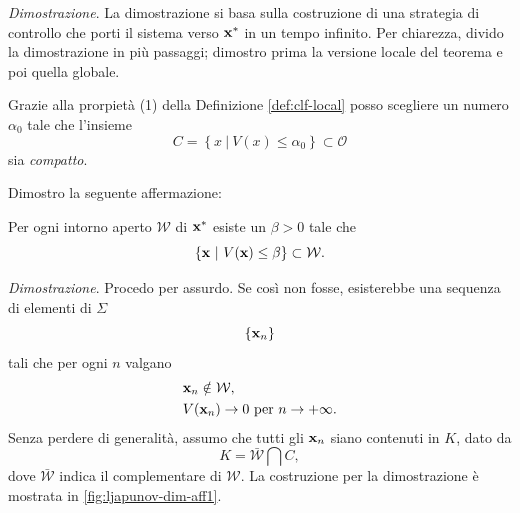 \emph{Dimostrazione}.
La dimostrazione si basa sulla costruzione di una strategia di
controllo che porti il sistema verso $\mathbf{x}^*$ in un tempo infinito.
Per chiarezza, divido la dimostrazione in più passaggi; dimostro prima la versione locale
del teorema e poi quella globale.
\begin{steps}
    \item Grazie alla prorpietà (1) della Definizione \ref{def:clf-local}
    posso scegliere un numero $\alpha_0$ tale che l'insieme
    \begin{equation}
        C = \left\{ x\ |\ V(x) \leq \alpha_0 \right\} \subset \mathcal O
        \label{eq:alpha_0}
    \end{equation}
    sia \emph{compatto}.

    Dimostro la seguente affermazione:

    \begin{aff}
        Per ogni intorno aperto $\mathcal W$ di $\mathbf{x}^*$ esiste
        un $\beta > 0$ tale che
        \begin{equation*}
            \{\mathbf{x}\ |\ V(\mathbf{x}) \leq \beta\} \subset \mathcal W.
        \end{equation*}
    \end{aff}

    \emph{Dimostrazione}.
    Procedo per assurdo.
    Se così non fosse, esisterebbe una sequenza di elementi di $\Sigma$
    \begin{equation*}
    \{\mathbf{x}_n\}
    \end{equation*}
    tali che per ogni $n$
    valgano
    \begin{align*}
        &\mathbf{x}_n \notin \mathcal W, \\
        &V(\mathbf{x}_n) \to 0 \text{ per } n \to +\infty.
    \end{align*}
    Senza perdere di generalità, assumo che tutti gli $\mathbf{x}_n$
    siano contenuti in $K$, dato da
    \begin{equation*}
        K = \bar{\mathcal W} \bigcap C,
    \end{equation*}
    dove $\bar{\mathcal W}$ indica il complementare di $\mathcal W$.
    La costruzione per la dimostrazione è mostrata in \autoref{fig:ljapunov-dim-aff1}.


\end{steps}
